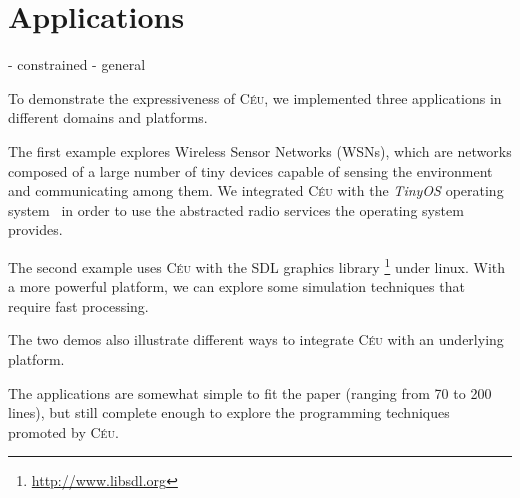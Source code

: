 \documentclass{sigplanconf}
\newcommand{\CEU}{\textsc{C\'{e}u}\xspace}
\newcommand{\1}{\;}
\newcommand{\2}{\;\;}
\newcommand{\3}{\;\;\;}
\newcommand{\5}{\;\;\;\;\;}
\begin{document}

\section{Applications}

- constrained
- general

To demonstrate the expressiveness of \CEU{}, we implemented three applications 
in different domains and platforms.

The first example explores Wireless Sensor Networks (WSNs), which are networks 
composed of a large number of tiny devices capable of sensing the environment 
and communicating among them.
We integrated \CEU with the \emph{TinyOS} operating system~\cite{wsn.tos} in 
order to use the abstracted radio services the operating system provides.

The second example uses \CEU with the SDL graphics library%
\footnote{\url{http://www.libsdl.org}} under linux.
With a more powerful platform, we can explore some simulation techniques that 
require fast processing.

The two demos also illustrate different ways to integrate \CEU{} with an 
underlying platform.

The applications are somewhat simple to fit the paper (ranging from 70 to 200 
lines), but still complete enough to explore the programming techniques 
promoted by \CEU{}.
\end{document}
